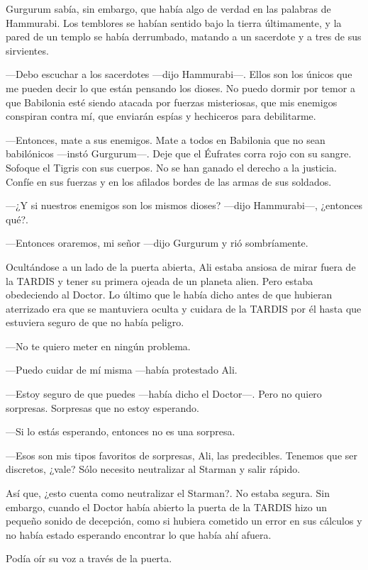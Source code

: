 Gurgurum sabía, sin embargo, que había algo de verdad en las palabras de
Hammurabi. Los temblores se habían sentido bajo la tierra últimamente, y
la pared de un templo se había derrumbado, matando a un sacerdote y a
tres de sus sirvientes.

---Debo escuchar a los sacerdotes ---dijo Hammurabi---. Ellos son los
únicos que me pueden decir lo que están pensando los dioses. No puedo
dormir por temor a que Babilonia esté siendo atacada por fuerzas
misteriosas, que mis enemigos conspiran contra mí, que enviarán espías y
hechiceros para debilitarme.

---Entonces, mate a sus enemigos. Mate a todos en Babilonia que no sean
babilónicos ---instó Gurgurum---. Deje que el Éufrates corra rojo con su
sangre. Sofoque el Tigris con sus cuerpos. No se han ganado el derecho a
la justicia. Confíe en sus fuerzas y en los afilados bordes de las armas
de sus soldados.

---¿Y si nuestros enemigos son los mismos dioses? ---dijo Hammurabi---,
¿entonces qué?.

---Entonces oraremos, mi señor ---dijo Gurgurum y rió sombríamente.

Ocultándose a un lado de la puerta abierta, Ali estaba ansiosa de mirar
fuera de la TARDIS y tener su primera ojeada de un planeta alien. Pero
estaba obedeciendo al Doctor. Lo último que le había dicho antes de que
hubieran aterrizado era que se mantuviera oculta y cuidara de la TARDIS
por él hasta que estuviera seguro de que no había peligro.

---No te quiero meter en ningún problema.

---Puedo cuidar de mí misma ---había protestado Ali.

---Estoy seguro de que puedes ---había dicho el Doctor---. Pero no
quiero sorpresas. Sorpresas que no estoy esperando.

---Si lo estás esperando, entonces no es una sorpresa.

---Esos son mis tipos favoritos de sorpresas, Ali, las predecibles.
Tenemos que ser discretos, ¿vale? Sólo necesito neutralizar al Starman y
salir rápido.

Así que, ¿esto cuenta como neutralizar el Starman?. No estaba segura.
Sin embargo, cuando el Doctor había abierto la puerta de la TARDIS hizo
un pequeño sonido de decepción, como si hubiera cometido un error en sus
cálculos y no había estado esperando encontrar lo que había ahí afuera.

Podía oír su voz a través de la puerta.

